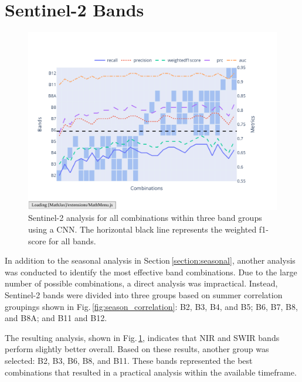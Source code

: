 \section{Sentinel-2 Bands}

\begin{figure}[ht]
    \centering
    \includegraphics[width=0.9\linewidth, trim={20pt 40pt 10pt 30pt}, clip]{figures/figures_analysis/band_selection.pdf}
    \caption{Sentinel-2 analysis for all combinations within three band groups using a CNN. The horizontal black line represents the weighted f1-score for all bands.}
    \label{fig:band_selection}
\end{figure}

In addition to the seasonal analysis in Section\,\ref{section:seasonal}, another analysis was conducted to identify the most effective band combinations. Due to the large number of possible combinations, a direct analysis was impractical. Instead, Sentinel-2 bands were divided into three groups based on summer correlation groupings shown in Fig.\,\ref{fig:season_correlation}: B2, B3, B4, and B5; B6, B7, B8, and B8A; and B11 and B12. 

The resulting analysis, shown in Fig.\,\ref{fig:band_selection}, indicates that NIR and SWIR bands perform slightly better overall. Based on these results, another group was selected: B2, B3, B6, B8, and B11. These bands represented the best combinations that resulted in a practical analysis within the available timeframe.

